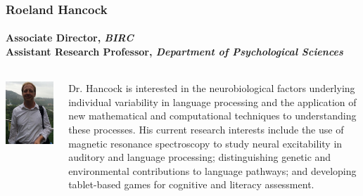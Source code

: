 \documentclass[aspectratio=169]{beamer}
\begin{document}
\begin{frame}
	\frametitle{Roeland Hancock}
	\framesubtitle{Associate Director, \textit{BIRC} \\
	Assistant Research Professor, \textit{Department of Psychological Sciences} }

	\begin{columns}[T]
		\begin{column}{.25\textwidth}
			\includegraphics[width=\textwidth]{img/hancock.jpg}
		\end{column}

		\begin{column}{.75\textwidth}
			Dr. Hancock is interested in the neurobiological factors underlying individual variability in language processing and the application of new mathematical and computational techniques to understanding these processes. His current research interests include the use of magnetic resonance spectroscopy to study neural excitability in auditory and language processing; distinguishing genetic and environmental contributions to language pathways; and developing tablet-based games for cognitive and literacy assessment. 
		\end{column}
	\end{columns}
\end{frame}
\end{document}
